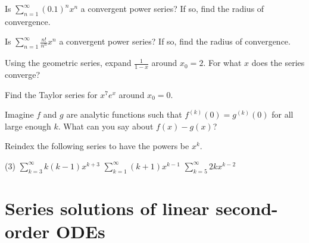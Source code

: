 \setcounter{exercise}{100}

\begin{exercise}
Is
$\displaystyle \sum_{n=1}^\infty {(0.1)}^n x^n$
a convergent power series?
If so, find the radius of convergence.
\end{exercise}

\begin{exercise}[challenging]
Is
$\displaystyle \sum_{n=1}^\infty \frac{n!}{n^n} x^n$
a convergent power series?
If so, find the radius of convergence.
\end{exercise}

\begin{exercise}
Using the geometric series, expand $\frac{1}{1-x}$ around $x_0=2$.
For what $x$ does the series converge?
\end{exercise}

\begin{exercise}[challenging]
Find the Taylor series for $x^7 e^x$ around $x_0 = 0$.
\end{exercise}

\begin{exercise}[challenging]
Imagine $f$ and $g$ are analytic functions such that
$f^{(k)}(0) = g^{(k)}(0)$ for all large enough $k$.  What can you
say about $f(x)-g(x)$?
\end{exercise}

\begin{exercise}
Reindex the following series to have the powers be $x^k$.
\begin{tasks}(3)
\task $\displaystyle \sum_{k=3}^\infty k(k-1)x^{k+3}$
\task $\displaystyle \sum_{k=1}^\infty (k+1)x^{k-1}$
\task $\displaystyle \sum_{k=5}^\infty 2kx^{k-2}$
\end{tasks}
\end{exercise}



\sectionnewpage
\section{Series solutions of linear second-order ODEs}
\label{seriessols:section}

